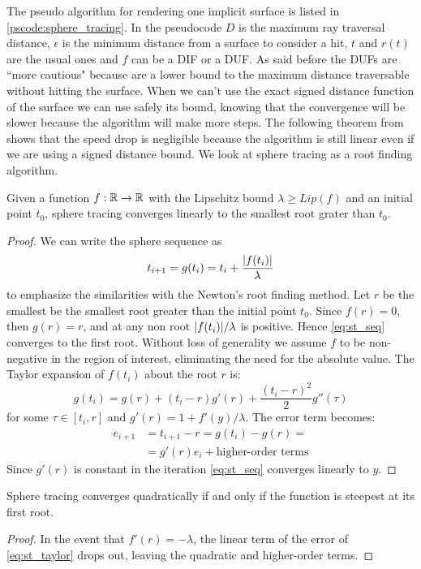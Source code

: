 The pseudo algorithm for rendering one implicit surface is listed in \autoref{pscode:sphere_tracing}.
In the pseudocode $D$ is the maximum ray traversal distance, $\epsilon$ is the minimum distance from a surface to consider a hit, $t$ and $r(t)$ are the usual ones and $f$ can be a DIF or a DUF.
As said before the DUFs are ``more cautious" because are a lower bound to the maximum distance traversable without hitting the surface.
When we can't use the exact signed distance function of the surface we can use safely its bound, knowing that the convergence will be slower because the algorithm will make more steps.
The following theorem from \cite{hart1996} shows that the speed drop is negligible because the algorithm is still linear even if we are using a signed distance bound.
We look at sphere tracing as a root finding algorithm.
\begin{theorem}
Given a function $f: \mathbb{R} \to \mathbb{R}$ with the Lipschitz bound $\lambda \geq Lip(f)$ and an initial point $t_0$, sphere tracing converges linearly to the smallest root grater than $t_0$.
\end{theorem}
\begin{proof}
  We can write the sphere sequence as
  \begin{equation}\label{eq:st_seq}
  t_{i+1} = g(t_i) = t_i + \dfrac{\lvert f(t_i) \lvert}{\lambda}
  \end{equation}
  to emphasize the similarities with the Newton's root finding method.
  Let $r$ be the smallest be the smallest root greater than the initial point $t_0$.
  Since $f(r) = 0$, then $g(r) = r$, and at any non root $\lvert f(t_i) \lvert/\lambda$ is positive.
  Hence \autoref{eq:st_seq} converges to the first root.
  Without loss of generality we assume $f$ to be non-negative in the region of interest, eliminating the need for the absolute value.
  The Taylor expansion of $f(t_i)$ about the root $r$ is:
  \begin{equation}\label{eq:st_taylor}
    g(t_i) = g(r) + (t_i - r) g'(r) + \dfrac{(t_i - r)^2}{2} g''(\tau)
  \end{equation}
  for some $\tau \in [t_i, r]$ and $g'(r) = 1 + f'(y)/\lambda$.
  The error term becomes:
  \begin{align*}
    e_{i+1} &= t_{i+1} - r = g(t_i) - g(r) =\\
            &= g'(r)e_i + \text{higher-order terms}
  \end{align*}
  Since $g'(r)$ is constant in the iteration \autoref{eq:st_seq} converges linearly to $y$.
\end{proof}
\begin{corollary}
  Sphere tracing converges quadratically if and only if the function is steepest at its first root.
\end{corollary}
\begin{proof}
  In the event that $f'(r) = - \lambda$, the linear term of the error of \autoref{eq:st_taylor} drops out, leaving the quadratic and higher-order terms.
\end{proof}

